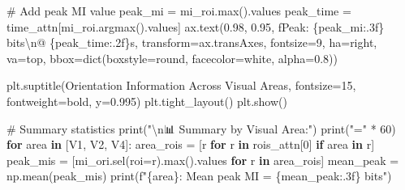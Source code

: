\documentclass[
  11pt,
  letterpaper,
  oneside,
  openany]{book}
\newenvironment{Shaded}{\begin{snugshade}}{\end{snugshade}}
\newcommand{\BuiltInTok}[1]{\textcolor[rgb]{0.00,0.23,0.31}{#1}}
\newcommand{\CharTok}[1]{\textcolor[rgb]{0.13,0.47,0.30}{#1}}
\newcommand{\CommentTok}[1]{\textcolor[rgb]{0.37,0.37,0.37}{#1}}
\newcommand{\ControlFlowTok}[1]{\textcolor[rgb]{0.00,0.23,0.31}{\textbf{#1}}}
\newcommand{\DecValTok}[1]{\textcolor[rgb]{0.68,0.00,0.00}{#1}}
\newcommand{\FloatTok}[1]{\textcolor[rgb]{0.68,0.00,0.00}{#1}}
\newcommand{\KeywordTok}[1]{\textcolor[rgb]{0.00,0.23,0.31}{\textbf{#1}}}
\newcommand{\NormalTok}[1]{\textcolor[rgb]{0.00,0.23,0.31}{#1}}
\newcommand{\OperatorTok}[1]{\textcolor[rgb]{0.37,0.37,0.37}{#1}}
\newcommand{\SpecialCharTok}[1]{\textcolor[rgb]{0.37,0.37,0.37}{#1}}
\newcommand{\SpecialStringTok}[1]{\textcolor[rgb]{0.13,0.47,0.30}{#1}}
\newcommand{\StringTok}[1]{\textcolor[rgb]{0.13,0.47,0.30}{#1}}
\begin{document}
\begin{Shaded}
\begin{Highlighting}[]
    \CommentTok{\# Add peak MI value}
\NormalTok{    peak\_mi }\OperatorTok{=}\NormalTok{ mi\_roi.}\BuiltInTok{max}\NormalTok{().values}
\NormalTok{    peak\_time }\OperatorTok{=}\NormalTok{ time\_attn[mi\_roi.argmax().values]}
\NormalTok{    ax.text(}\FloatTok{0.98}\NormalTok{, }\FloatTok{0.95}\NormalTok{, }\SpecialStringTok{f\textquotesingle{}Peak: }\SpecialCharTok{\{}\NormalTok{peak\_mi}\SpecialCharTok{:.3f\}}\SpecialStringTok{ bits}\CharTok{\textbackslash{}n}\SpecialStringTok{@ }\SpecialCharTok{\{}\NormalTok{peak\_time}\SpecialCharTok{:.2f\}}\SpecialStringTok{s\textquotesingle{}}\NormalTok{,}
\NormalTok{            transform}\OperatorTok{=}\NormalTok{ax.transAxes, fontsize}\OperatorTok{=}\DecValTok{9}\NormalTok{,}
\NormalTok{            ha}\OperatorTok{=}\StringTok{\textquotesingle{}right\textquotesingle{}}\NormalTok{, va}\OperatorTok{=}\StringTok{\textquotesingle{}top\textquotesingle{}}\NormalTok{,}
\NormalTok{            bbox}\OperatorTok{=}\BuiltInTok{dict}\NormalTok{(boxstyle}\OperatorTok{=}\StringTok{\textquotesingle{}round\textquotesingle{}}\NormalTok{, facecolor}\OperatorTok{=}\StringTok{\textquotesingle{}white\textquotesingle{}}\NormalTok{, alpha}\OperatorTok{=}\FloatTok{0.8}\NormalTok{))}

\NormalTok{plt.suptitle(}\StringTok{\textquotesingle{}Orientation Information Across Visual Areas\textquotesingle{}}\NormalTok{, }
\NormalTok{             fontsize}\OperatorTok{=}\DecValTok{15}\NormalTok{, fontweight}\OperatorTok{=}\StringTok{\textquotesingle{}bold\textquotesingle{}}\NormalTok{, y}\OperatorTok{=}\FloatTok{0.995}\NormalTok{)}
\NormalTok{plt.tight\_layout()}
\NormalTok{plt.show()}

\CommentTok{\# Summary statistics}
\BuiltInTok{print}\NormalTok{(}\StringTok{"}\CharTok{\textbackslash{}n}\StringTok{📊 Summary by Visual Area:"}\NormalTok{)}
\BuiltInTok{print}\NormalTok{(}\StringTok{"="} \OperatorTok{*} \DecValTok{60}\NormalTok{)}
\ControlFlowTok{for}\NormalTok{ area }\KeywordTok{in}\NormalTok{ [}\StringTok{\textquotesingle{}V1\textquotesingle{}}\NormalTok{, }\StringTok{\textquotesingle{}V2\textquotesingle{}}\NormalTok{, }\StringTok{\textquotesingle{}V4\textquotesingle{}}\NormalTok{]:}
\NormalTok{    area\_rois }\OperatorTok{=}\NormalTok{ [r }\ControlFlowTok{for}\NormalTok{ r }\KeywordTok{in}\NormalTok{ rois\_attn[}\DecValTok{0}\NormalTok{] }\ControlFlowTok{if}\NormalTok{ area }\KeywordTok{in}\NormalTok{ r]}
\NormalTok{    peak\_mis }\OperatorTok{=}\NormalTok{ [mi\_ori.sel(roi}\OperatorTok{=}\NormalTok{r).}\BuiltInTok{max}\NormalTok{().values }\ControlFlowTok{for}\NormalTok{ r }\KeywordTok{in}\NormalTok{ area\_rois]}
\NormalTok{    mean\_peak }\OperatorTok{=}\NormalTok{ np.mean(peak\_mis)}
    \BuiltInTok{print}\NormalTok{(}\SpecialStringTok{f"}\SpecialCharTok{\{}\NormalTok{area}\SpecialCharTok{\}}\SpecialStringTok{: Mean peak MI = }\SpecialCharTok{\{}\NormalTok{mean\_peak}\SpecialCharTok{:.3f\}}\SpecialStringTok{ bits"}\NormalTok{)}


\end{Highlighting}
\end{Shaded}
\end{document}
